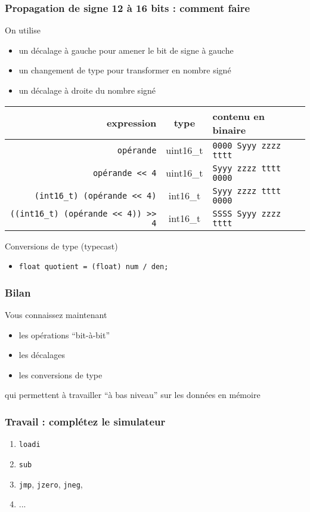 \documentclass[]{beamer}
\begin{document}
\begin{frame}[containsverbatim]
\frametitle{Propagation de signe 12 à 16 bits : comment faire}

On utilise
\begin{itemize}
\item un \alert{décalage à gauche} pour amener le bit de signe à gauche
\item un \alert{changement de type} pour transformer en nombre signé
\item un \alert{décalage à droite} du nombre signé
\end{itemize}

{ \small
\begin{tabular}{r|c|l}
expression & type & contenu en binaire \\
\hline
\verb+opérande+ & uint16\_t & \texttt{0000 Syyy zzzz tttt} \\
\verb+opérande << 4+ & uint16\_t & \texttt{Syyy zzzz tttt 0000} \\
\hline
\verb+(int16_t) (opérande << 4)+ & \alert{int16\_t} & \texttt{Syyy zzzz tttt 0000} \\
\verb+((int16_t) (opérande << 4)) >> 4+ & int16\_t & \texttt{SSSS Syyy zzzz tttt} \\
\hline
\end{tabular}
}

\vspace{1cm}

\alert{Conversions de type} (typecast) 
  \begin{itemize}
\item \texttt{float quotient = (float) num / den;}
  \end{itemize}
\end{frame}


\begin{frame}
\frametitle{Bilan}
Vous connaissez maintenant
\begin{itemize}
\item les opérations ``bit-à-bit''
\item les décalages
\item les conversions de type
\end{itemize}
qui permettent à travailler ``à bas niveau'' sur les données
en mémoire
\end{frame}

\begin{frame}
\frametitle{Travail : complétez le simulateur}
\begin{enumerate}
\item \texttt{loadi}
\item \texttt{sub}
\item \texttt{jmp},  \texttt{jzero}, \texttt{jneg},
\item ...
\end{enumerate}
\end{frame}
\end{document}
